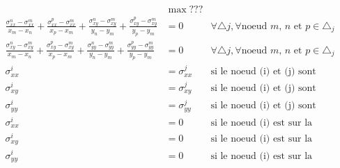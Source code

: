 \begin{align}
& \max ??? \\
\frac{\sigma_{xx}^n - \sigma_{xx}^m}{x_m - x_n}  + \frac{\sigma_{xx}^p - \sigma_{xx}^m}{x_p - x_m} + \frac{\sigma_{xy}^n - \sigma_{xy}^m}{y_n - y_m} + \frac{\sigma_{xy}^p - \sigma_{xy}^m}{y_p - y_m} &= 0  & \forall \triangle j, \forall \text{noeud $m$, $n$ et $p$} \in \triangle_j \\
\frac{\sigma_{xy}^n - \sigma_{xy}^m}{x_m - x_n}  + \frac{\sigma_{xy}^p - \sigma_{xy}^m}{x_p - x_m} + \frac{\sigma_{yy}^n - \sigma_{yy}^m}{y_n - y_m} + \frac{\sigma_{yy}^p - \sigma_{yy}^m}{y_p - y_m} &= 0  & \forall \triangle j, \forall \text{noeud $m$, $n$ et $p$} \in \triangle_j \\
\sigma_{xx}^i &= \sigma_{xx}^j & \text{si le noeud (i) et (j) sont confondus}\\
\sigma_{xy}^i &= \sigma_{xy}^j & \text{si le noeud (i) et (j) sont confondus}\\
\sigma_{yy}^i &= \sigma_{yy}^j & \text{si le noeud (i) et (j) sont confondus}\\
\sigma_{xx}^i &= 0 & \text{si le noeud (i) est sur la frontière} \\
\sigma_{xy}^i &= 0 & \text{si le noeud (i) est sur la frontière}\\
\sigma_{yy}^i &= 0 & \text{si le noeud (i) est sur la frontière}
\end{align}




